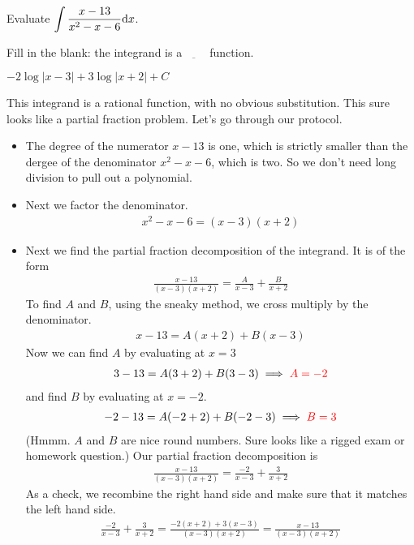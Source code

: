 \begin{question}[M105 2014A]
Evaluate $\displaystyle\int \frac{x-13}{x^2-x-6}\mathrm{d}x$.
\end{question}

\begin{hint}
Fill in the blank: the integrand is a $\underbar{\ \ \ \ \ \ \ \ }$ function.
\end{hint}

\begin{answer}
$-2\log|x-3|+3\log|x+2|+C$
\end{answer}

\begin{solution}
This integrand is a rational function, with no obvious substitution. This sure looks like a partial fraction problem. Let's go through our protocol.
\begin{itemize}
\item
The degree of the numerator $x-13$ is one, which is strictly smaller
than the dergee of the denominator $x^2-x-6$, which is two. So we don't need long division to pull out a polynomial.

\item
Next we factor the denominator.
\begin{align*}
x^2-x-6 = (x-3)(x+2)
\end{align*}

\item
Next we find the partial fraction decomposition of the integrand. It is
of the form
\begin{align*}
\frac{x-13}{(x-3)(x+2)}
=\frac{A}{x-3} + \frac{B}{x+2}
\end{align*}
To find $A$ and $B$, using the sneaky method, we cross multiply by the
denominator.
\begin{align*}
x-13 = A(x+2) + B(x-3)
\end{align*}
Now we can find $A$ by evaluating at $x=3$
\begin{align*}
3-13 = A(3+2) + B(3-3)
\implies \color{red}A=-2
\end{align*}
and find $B$ by evaluating at $x=-2$.
\begin{align*}
-2-13 = A(-2+2) + B(-2-3)
\implies \color{red}B=3
\end{align*}
(Hmmm. $A$ and $B$ are nice round numbers. Sure looks like a rigged exam or
homework question.) Our partial fraction decomposition is
\begin{align*}
\frac{x-13}{(x-3)(x+2)}
=\frac{-2}{x-3} + \frac{3}{x+2}
\end{align*}
As a check, we recombine the right hand side and make sure that
it matches the left hand side.
\begin{align*}
\frac{-2}{x-3} + \frac{3}{x+2}
=\frac{-2(x+2)+3(x-3)}{(x-3)(x+2)}
=\frac{x-13}{(x-3)(x+2)}
\end{align*}


\end{itemize}
\end{solution}
